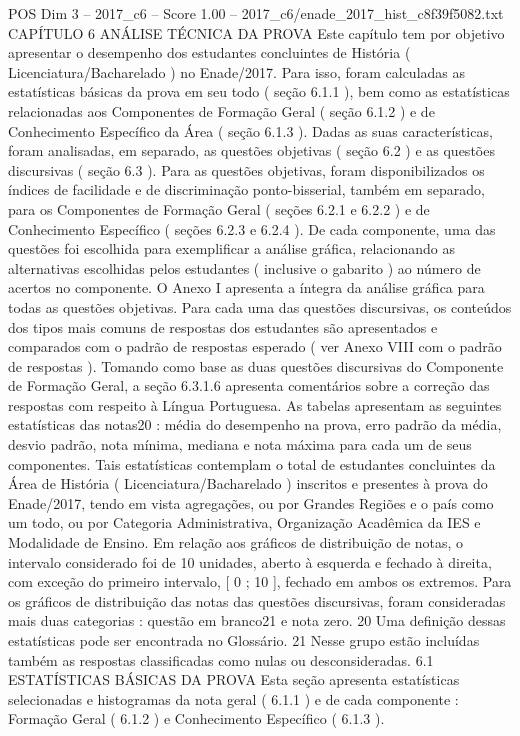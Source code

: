 \begin{textsample}{POS Dim 3 – 2017\_c6 – Score 1.00 – 2017\_c6/enade\_2017\_hist\_c8f39f5082.txt}  \label{ex:f3_pos_197}
CAPÍTULO 6 ANÁLISE TÉCNICA DA PROVA Este capítulo tem por objetivo apresentar o desempenho dos estudantes concluintes de História ( Licenciatura/Bacharelado ) no Enade/2017.
Para isso, foram calculadas as estatísticas básicas da prova em seu todo ( seção 6.1.1 ), bem como as estatísticas relacionadas aos Componentes de Formação Geral ( seção 6.1.2 ) e de Conhecimento Específico da Área ( seção 6.1.3 ).
Dadas as suas características, foram analisadas, em separado, as questões objetivas ( seção 6.2 ) e as questões discursivas ( seção 6.3 ).
Para as questões objetivas, foram disponibilizados os índices de facilidade e de discriminação ponto-bisserial, também em separado, para os Componentes de Formação Geral ( seções 6.2.1 e 6.2.2 ) e de Conhecimento Específico ( seções 6.2.3 e 6.2.4 ).
De cada componente, uma das questões foi escolhida para exemplificar a análise gráfica, relacionando as alternativas escolhidas pelos estudantes ( inclusive o gabarito ) ao número de acertos no componente.
O Anexo I apresenta a íntegra da análise gráfica para todas as questões objetivas.
Para cada uma das questões discursivas, os conteúdos dos tipos mais comuns de respostas dos estudantes são apresentados e comparados com o padrão de respostas esperado ( ver Anexo VIII com o padrão de respostas ).
Tomando como base as duas questões discursivas do Componente de Formação Geral, a seção 6.3.1.6 apresenta comentários sobre a correção das respostas com respeito à Língua Portuguesa.
As tabelas apresentam as seguintes estatísticas das notas20 : média do desempenho na prova, erro padrão da média, desvio padrão, nota mínima, mediana e nota máxima para cada um de seus componentes.
Tais estatísticas contemplam o total de estudantes concluintes da Área de História ( Licenciatura/Bacharelado ) inscritos e presentes à prova do Enade/2017, tendo em vista agregações, ou por Grandes Regiões e o país como um todo, ou por Categoria Administrativa, Organização Acadêmica da IES e Modalidade de Ensino.
Em relação aos gráficos de distribuição de notas, o intervalo considerado foi de 10 unidades, aberto à esquerda e fechado à direita, com exceção do primeiro intervalo, [ 0 ; 10 ], fechado em ambos os extremos.
Para os gráficos de distribuição das notas das questões discursivas, foram consideradas mais duas categorias : questão em branco21 e nota zero. 20 Uma definição dessas estatísticas pode ser encontrada no Glossário. 21 Nesse grupo estão incluídas também as respostas classificadas como nulas ou desconsideradas. 6.1 ESTATÍSTICAS BÁSICAS DA PROVA Esta seção apresenta estatísticas selecionadas e histogramas da nota geral ( 6.1.1 ) e de cada componente : Formação Geral ( 6.1.2 ) e Conhecimento Específico ( 6.1.3 ).

\end{textsample}
